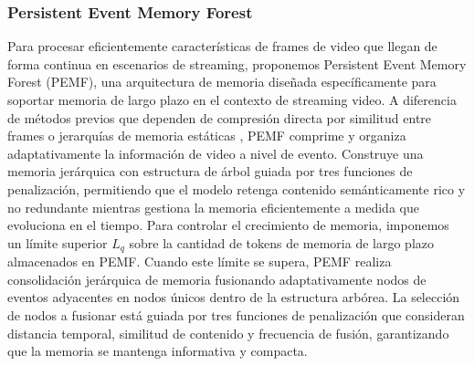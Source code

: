 

\subsubsection{Persistent Event Memory Forest}


Para procesar eficientemente características de frames de video que llegan de forma continua en escenarios de streaming, proponemos Persistent Event Memory Forest (PEMF), una arquitectura de memoria diseñada específicamente para soportar memoria de largo plazo en el contexto de streaming video. A diferencia de métodos previos que dependen de compresión directa por similitud entre frames \cite{song2024moviechat} o jerarquías de memoria estáticas \cite{huang2024videochatonline}, PEMF comprime y organiza adaptativamente la información de video a nivel de evento. Construye una memoria jerárquica con estructura de árbol guiada por tres funciones de penalización, permitiendo que el modelo retenga contenido semánticamente rico y no redundante mientras gestiona la memoria eficientemente a medida que evoluciona en el tiempo. Para controlar el crecimiento de memoria, imponemos un límite superior $L_q$ sobre la cantidad de tokens de memoria de largo plazo almacenados en PEMF. Cuando este límite se supera, PEMF realiza consolidación jerárquica de memoria fusionando adaptativamente nodos de eventos adyacentes en nodos únicos dentro de la estructura arbórea. La selección de nodos a fusionar está guiada por tres funciones de penalización que consideran distancia temporal, similitud de contenido y frecuencia de fusión, garantizando que la memoria se mantenga informativa y compacta.


